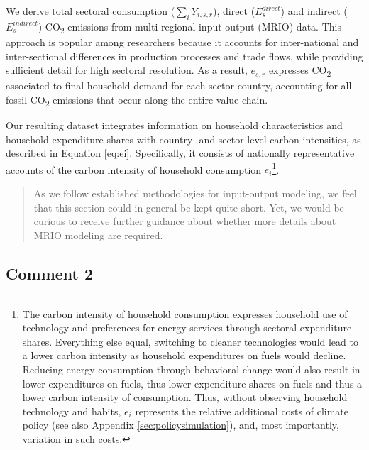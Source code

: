 \documentclass[11pt]{article}
\newenvironment{response}
{\begin{quote}\color{black}}
{\end{quote}}
\begin{document}
\begin{revisionbox}
    We derive total sectoral consumption ($\sum_{i} Y_{i,s,r}$), direct ($E_{s}^{direct}$) and indirect ($E_{s}^{indirect}$) CO\textsubscript{2} emissions from  multi-regional input-output (MRIO) data. This approach is popular among researchers because it accounts for inter-national and inter-sectional differences in production processes and trade flows, while providing sufficient detail for high sectoral resolution. As a result, $e_{s,r}$ expresses CO\textsubscript{2} associated to final household demand for each sector country, accounting for all fossil CO\textsubscript{2} emissions that occur along the entire value chain.
\end{revisionbox}

\begin{revisionbox}
    Our resulting dataset integrates information on household characteristics and household expenditure shares with country- and sector-level carbon intensities, as described in Equation \ref{eq:ei}. Specifically, it consists of nationally representative accounts of the carbon intensity of household consumption $e_{i}$\footnote{The carbon intensity of household consumption expresses household use of technology and preferences for energy services through sectoral expenditure shares. Everything else equal, switching to cleaner technologies would lead to a lower carbon intensity as household expenditures on fuels would decline. Reducing energy consumption through behavioral change would also result in lower expenditures on fuels, thus lower expenditure shares on fuels and thus a lower carbon intensity of consumption. Thus, without observing household technology and habits, $e_{i}$ represents the relative additional costs of climate policy (see also Appendix \ref{sec:policysimulation}), and, most importantly, variation in such costs.}.
\end{revisionbox}

\begin{response}
    As we follow established methodologies for input-output modeling, we feel that this section could in general be kept quite short. Yet, we would be curious to receive further guidance about whether more details about MRIO modeling are required.
\end{response}

\subsection*{Comment 2}\label{comment_R2_2}
\end{document}
